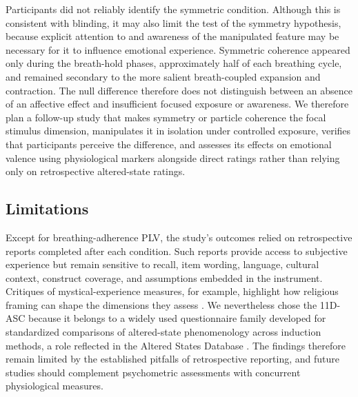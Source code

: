 \documentclass[pdflatex,sn-basic,lineno]{sn-jnl}
\begin{document}
Participants did not reliably identify the symmetric condition. Although this is consistent with blinding, it may also limit the test of the symmetry hypothesis, because explicit attention to and awareness of the manipulated feature may be necessary for it to influence emotional experience. Symmetric coherence appeared only during the breath-hold phases, approximately half of each breathing cycle, and remained secondary to the more salient breath-coupled expansion and contraction. The null difference therefore does not distinguish between an absence of an affective effect and insufficient focused exposure or awareness. We therefore plan a follow-up study that makes symmetry or particle coherence the focal stimulus dimension, manipulates it in isolation under controlled exposure, verifies that participants perceive the difference, and assesses its effects on emotional valence using physiological markers alongside direct ratings rather than relying only on retrospective altered-state ratings.



\subsection{Limitations}
Except for breathing-adherence PLV, the study's outcomes relied on retrospective reports completed after each condition. Such reports provide access to subjective experience but remain sensitive to recall, item wording, language, cultural context, construct coverage, and assumptions embedded in the instrument. Critiques of mystical-experience measures, for example, highlight how religious framing can shape the dimensions they assess \citep{sanders2021moving,Hovmand2023,DeusPontual2022}. We nevertheless chose the 11D-ASC because it belongs to a widely used questionnaire family developed for standardized comparisons of altered-state phenomenology across induction methods, a role reflected in the Altered States Database \citep{Dittrich1998,SchmidtBerkemeyer2018,Prugger2022}. The findings therefore remain limited by the established pitfalls of retrospective reporting, and future studies should complement psychometric assessments with concurrent physiological measures.
\end{document}
